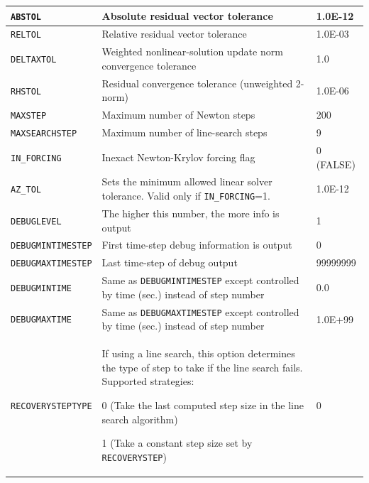 \begin{longtable}[htbp]{|>{\setlength{\hsize}{.8\hsize}}Y|
>{\setlength{\hsize}{1.5\hsize}}Y|
>{\setlength{\hsize}{.7\hsize}}Y|}
\texttt{ABSTOL} & Absolute residual vector tolerance &
1.0E-12 \\ \hline

\texttt{RELTOL} & Relative residual vector tolerance &
1.0E-03 \\ \hline

\texttt{DELTAXTOL} & Weighted nonlinear-solution update norm convergence
tolerance & 1.0 \\ \hline

\texttt{RHSTOL} & Residual convergence tolerance (unweighted 2-norm) &
1.0E-06 \\ \hline

\texttt{MAXSTEP} & Maximum number of Newton steps & 200
\\ \hline

\texttt{MAXSEARCHSTEP} & Maximum number of line-search steps & 9 \\ \hline

\texttt{IN\_FORCING} & Inexact Newton-Krylov forcing flag & 0 (FALSE) \\ \hline

\texttt{AZ\_TOL} &  Sets the minimum allowed linear solver tolerance. Valid only if \texttt{IN\_FORCING}=1.  & 1.0E-12 \\ \hline

\texttt{DEBUGLEVEL} & The higher this number, the more info is output & 1
\\ \hline

\texttt{DEBUGMINTIMESTEP} & First time-step debug information is output & 0
\\ \hline

\texttt{DEBUGMAXTIMESTEP} & Last time-step of debug output & 99999999 \\
\hline

\texttt{DEBUGMINTIME} & Same as \texttt{DEBUGMINTIMESTEP} except controlled by
time (sec.) instead of step number & 0.0 \\ \hline

\texttt{DEBUGMAXTIME} & Same as \texttt{DEBUGMAXTIMESTEP} except controlled by
time (sec.) instead of step number & 1.0E+99 \\ \hline

\texttt{RECOVERYSTEPTYPE} &  If using a line search, this option determines the type of step to take if the line search fails. Supported strategies:
\begin{XyceItemize}
\item 0 (Take the last computed step size in the line search algorithm)
\item 1 (Take a constant step size set by \texttt{RECOVERYSTEP})
\end{XyceItemize} & 0 \\ \hline


\end{longtable}
